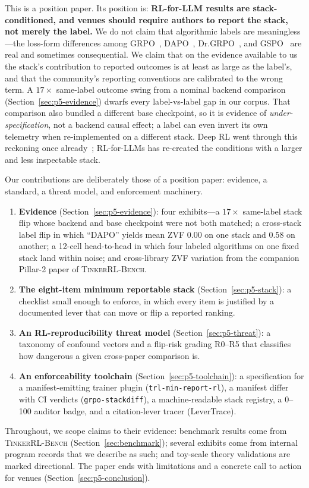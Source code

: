 \documentclass{article}  \usepackage[preprint,nonatbib]{neurips_2026} \usepackage[numbers]{natbib}
\newcommand{\ours}{\textsc{TinkerRL-Bench}}
\providecommand{\secref}[1]{Section~\ref{#1}}
\begin{document}
This is a position paper. Its position is: \textbf{RL-for-LLM results are
stack-conditioned, and venues should require authors to report the stack, not
merely the label.} We do not claim that algorithmic labels are meaningless---the
loss-form differences among GRPO~\citep{shao2024deepseekmath, guo2025deepseekr1},
DAPO~\citep{yu2025dapo}, Dr.GRPO~\citep{tong2025drgrpo}, and
GSPO~\citep{qwen2025gspo} are real and sometimes consequential. We claim that on
the evidence available to us the stack's contribution to reported outcomes is at
least as large as the label's, and that the community's reporting conventions are
calibrated to the wrong term. A $17\times$ same-label outcome swing from a
nominal backend comparison (\secref{sec:p5-evidence}) dwarfs every label-vs-label
gap in our corpus. That comparison also bundled a different base checkpoint, so
it is evidence of \emph{under-specification}, not a backend causal effect; a label
can even invert its own telemetry when re-implemented on a
different stack. Deep RL went through this reckoning once
already~\citep{henderson2018deep, colas2019hitchhiker, agarwal2021deep};
RL-for-LLMs has re-created the conditions with a larger and less inspectable
stack.

Our contributions are deliberately those of a position paper: evidence, a
standard, a threat model, and enforcement machinery.
\begin{enumerate}[leftmargin=1.5em, itemsep=1pt, topsep=2pt]
\item \textbf{Evidence} (\secref{sec:p5-evidence}): four exhibits---a
$17\times$ same-label stack flip whose backend and base checkpoint were not both
matched; a cross-stack
label flip in which ``DAPO'' yields mean ZVF $0.00$ on one stack and $0.58$ on
another; a 12-cell head-to-head in which four labeled algorithms on one fixed
stack land within noise; and cross-library ZVF variation from the companion
Pillar-2 paper of \ours{}.
\item \textbf{The eight-item minimum reportable stack} (\secref{sec:p5-stack}):
a checklist small enough to enforce, in which every item is justified by a
documented lever that can move or flip a reported ranking.
\item \textbf{An RL-reproducibility threat model} (\secref{sec:p5-threat}): a
taxonomy of confound vectors and a flip-risk grading R0--R5 that classifies how
dangerous a given cross-paper comparison is.
\item \textbf{An enforceability toolchain} (\secref{sec:p5-toolchain}): a
specification for a manifest-emitting trainer plugin
(\texttt{trl-min-report-rl}), a manifest differ with CI verdicts
(\texttt{grpo-stackdiff}), a machine-readable stack registry, a 0--100 auditor
badge, and a citation-lever tracer (LeverTrace).
\end{enumerate}
Throughout, we scope claims to their evidence: benchmark results come from
\ours{} (\secref{sec:benchmark}); several exhibits come from internal program
records that we describe as such; and toy-scale theory validations are marked
directional. The paper ends with limitations and a concrete call to action for
venues (\secref{sec:p5-conclusion}).
\end{document}
